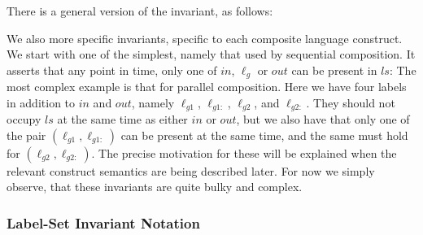 There is a general version of the invariant, as follows:

We also more specific invariants, specific to each composite language construct.
We start with one of the simplest,
namely that used by sequential composition.
It asserts that any point in time,
only one of $in$, $\ell_g$ or $out$ can be present in $ls$:
The most complex example is that for parallel composition.
Here we have four labels in addition to $in$ and $out$,
namely $\ell_{g1}$, $\ell_{g1:}$, $\ell_{g2}$, and $\ell_{g2:}$.
They should not occupy $ls$ at the same time as either $in $ or $out$,
but we also have that only one of the pair $(\ell_{g1},\ell_{g1:})$
can be present at the same time,
and the same must hold  for $(\ell_{g2},\ell_{g2:})$.
The precise motivation for these will be explained when the relevant
construct semantics are being described later.
For now we simply observe,
that these invariants are quite bulky and complex.



\subsubsection{Label-Set Invariant Notation}

